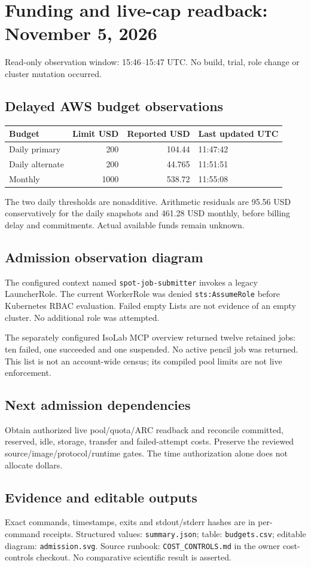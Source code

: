 \documentclass[11pt]{article}
\begin{document}
\section*{Funding and live-cap readback: November 5, 2026}
Read-only observation window: 15:46--15:47 UTC. No build, trial, role change or cluster mutation occurred.
\subsection*{Delayed AWS budget observations}
\begin{tabular}{lrrl}
Budget & Limit USD & Reported USD & Last updated UTC\\\hline
Daily primary & 200 & 104.44 & 11:47:42\\
Daily alternate & 200 & 44.765 & 11:51:51\\
Monthly & 1000 & 538.72 & 11:55:08
\end{tabular}

The two daily thresholds are nonadditive. Arithmetic residuals are 95.56 USD conservatively for the daily snapshots and 461.28 USD monthly, before billing delay and commitments. Actual available funds remain unknown.
\subsection*{Admission observation diagram}

The configured context named \texttt{spot-job-submitter} invokes a legacy LauncherRole. The current WorkerRole was denied \texttt{sts:AssumeRole} before Kubernetes RBAC evaluation. Failed empty Lists are not evidence of an empty cluster. No additional role was attempted.

The separately configured IsoLab MCP overview returned twelve retained jobs: ten failed, one succeeded and one suspended. No active pencil job was returned. This list is not an account-wide census; its compiled pool limits are not live enforcement.
\subsection*{Next admission dependencies}
Obtain authorized live pool/quota/ARC readback and reconcile committed, reserved, idle, storage, transfer and failed-attempt costs. Preserve the reviewed source/image/protocol/runtime gates. The time authorization alone does not allocate dollars.
\subsection*{Evidence and editable outputs}
Exact commands, timestamps, exits and stdout/stderr hashes are in per-command receipts. Structured values: \texttt{summary.json}; table: \texttt{budgets.csv}; editable diagram: \texttt{admission.svg}. Source runbook: \texttt{COST\_CONTROLS.md} in the owner cost-controls checkout. No comparative scientific result is asserted.
\end{document}
